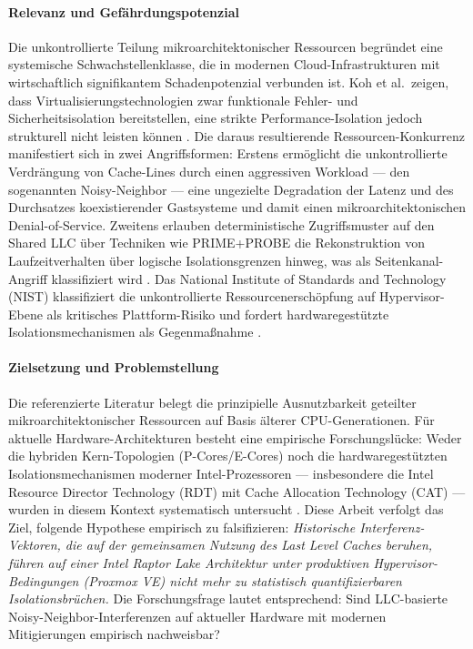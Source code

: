 \documentclass[conference]{IEEEtran}
\begin{document}
\paragraph{Relevanz und Gefährdungspotenzial}
Die unkontrollierte Teilung mikroarchitektonischer Ressourcen begründet
eine systemische Schwachstellenklasse, die in modernen
Cloud-Infrastrukturen mit wirtschaftlich signifikantem Schadenpotenzial
verbunden ist. Koh et al.\ zeigen, dass Virtualisierungstechnologien
zwar funktionale Fehler- und Sicherheitsisolation bereitstellen, eine
strikte Performance-Isolation jedoch strukturell nicht leisten können
\cite{koh2007analysis}. Die daraus resultierende Ressourcen-Konkurrenz
manifestiert sich in zwei Angriffsformen: Erstens ermöglicht die
unkontrollierte Verdrängung von Cache-Lines durch einen aggressiven
Workload --- den sogenannten Noisy-Neighbor --- eine ungezielte
Degradation der Latenz und des Durchsatzes koexistierender Gastsysteme
und damit einen mikroarchitektonischen Denial-of-Service. Zweitens
erlauben deterministische Zugriffsmuster auf den Shared LLC über
Techniken wie PRIME+PROBE die Rekonstruktion von Laufzeitverhalten
über logische Isolationsgrenzen hinweg, was als Seitenkanal-Angriff
klassifiziert wird \cite{ge2018survey}. Das National Institute of
Standards and Technology (NIST) klassifiziert die unkontrollierte
Ressourcenerschöpfung auf Hypervisor-Ebene als kritisches
Plattform-Risiko und fordert hardwaregestützte Isolationsmechanismen
als Gegenmaßnahme \cite{nist2014hypervisor}.

\paragraph{Zielsetzung und Problemstellung}
Die referenzierte Literatur belegt die prinzipielle Ausnutzbarkeit
geteilter mikroarchitektonischer Ressourcen auf Basis älterer
CPU-Generationen. Für aktuelle Hardware-Architekturen besteht eine
empirische Forschungslücke: Weder die hybriden Kern-Topologien
(P-Cores/E-Cores) noch die hardwaregestützten Isolationsmechanismen
moderner Intel-Prozessoren --- insbesondere die Intel Resource Director
Technology (RDT) mit Cache Allocation Technology (CAT) --- wurden in
diesem Kontext systematisch untersucht
\cite{koh2007analysis,ge2018survey}. Diese Arbeit verfolgt das Ziel,
folgende Hypothese empirisch zu falsifizieren: \textit{Historische
Interferenz-Vektoren, die auf der gemeinsamen Nutzung des Last Level
Caches beruhen, führen auf einer Intel Raptor Lake Architektur unter
produktiven Hypervisor-Bedingungen (Proxmox VE) nicht mehr zu statistisch
quantifizierbaren Isolationsbrüchen.} Die Forschungsfrage lautet
entsprechend: Sind LLC-basierte Noisy-Neighbor-Interferenzen auf
aktueller Hardware mit modernen Mitigierungen empirisch nachweisbar?
\end{document}
